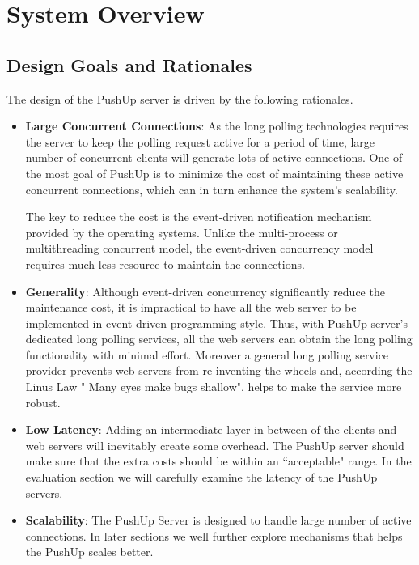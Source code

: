 \section {System Overview\\}

\subsection{Design Goals and Rationales\\}
The design of the PushUp server is driven by the following rationales.
\begin{itemize}
\item {\bf Large Concurrent Connections}:
    As the long polling technologies requires the server to keep the polling
    request active for a period of time, large number of concurrent clients 
    will generate lots of active connections. One of the most goal of PushUp
    is to minimize the cost of maintaining these active concurrent connections,
    which can in turn enhance the system's scalability.
     
    The key to reduce the cost is the event-driven notification mechanism 
    provided by the operating systems. Unlike the multi-process or 
    multithreading concurrent model, the event-driven concurrency model 
    requires much less resource to maintain the connections.

\item {\bf Generality}: Although event-driven concurrency significantly 
    reduce the maintenance cost, it is impractical to have all the web 
    server to be implemented in event-driven programming style. Thus, with 
    PushUp server's dedicated long polling services, all the web servers 
    can obtain the long polling functionality with minimal effort. Moreover
    a general long polling service provider prevents web servers from 
    re-inventing the wheels and, according the Linus Law\cite{Linus} "
    Many eyes make bugs shallow", helps to make the service more robust.
 
\item {\bf Low Latency}: Adding an intermediate layer in between of the 
    clients and web servers will inevitably create some overhead. 
    The PushUp server should make sure that the extra costs should be within
    an ``acceptable" range. In the evaluation section we will carefully examine
    the latency of the PushUp servers.

\item {\bf Scalability}: The PushUp Server is designed to handle large number of
    active connections. In later sections we well further explore mechanisms 
    that helps the PushUp scales better.  

\end{itemize}

